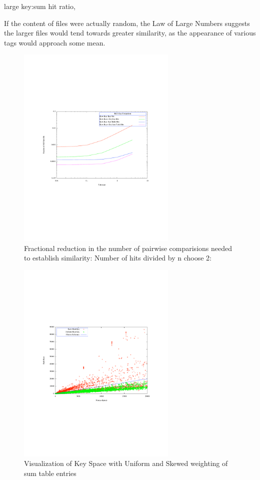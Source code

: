 \documentclass[10pt, twocolumn]{article}
\begin{document}
large key:sum hit ratio, 



 If the content of files were actually random, the Law of Large Numbers suggests the larger files would tend towards greater similarity, as the appearance of various tags would approach some mean.  

 \begin{figure}[h] 
 \centering
\includegraphics[width= 3in]{PairwiseElim.pdf}
\caption{Fractional reduction in the number of pairwise comparisions needed to establish similarity: Number of hits divided by n choose 2: }
\label{PairwiseSavings} 
\end{figure}    

 \begin{figure}[h] 
 \centering
\includegraphics[width= 3in]{scatter_circles.pdf}
\caption{Visualization of Key Space with Uniform and Skewed weighting of sum table entries 
}
\label{scatterPoster} 
\end{figure}   
\end{document}
